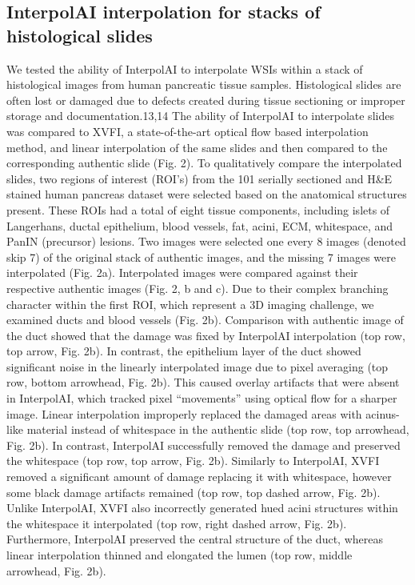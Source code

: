\begin{refsection}
    \section{InterpolAI interpolation for stacks of histological slides}
    We tested the ability of InterpolAI to interpolate WSIs within a stack of histological images from human pancreatic tissue samples. Histological slides are often lost or damaged due to defects created during tissue sectioning or improper storage and documentation\cite{}.13,14 The ability of InterpolAI to interpolate slides was compared to XVFI, a state-of-the-art optical flow based interpolation method, and linear interpolation of the same slides and then compared to the corresponding authentic slide (Fig. 2)\cite{leng2013a,upchurch2017a,liu2011a,blu2004a}. To qualitatively compare the interpolated slides, two regions of interest (ROI’s) from the 101 serially sectioned and H\&E stained human pancreas dataset were selected based on the anatomical structures present. These ROIs had a total of eight tissue components, including islets of Langerhans, ductal epithelium, blood vessels, fat, acini, ECM, whitespace, and PanIN (precursor) lesions. Two images were selected one every 8 images (denoted skip 7) of the original stack of authentic images, and the missing 7 images were interpolated (Fig. 2a). Interpolated images were compared against their respective authentic images (Fig. 2, b and c).
    Due to their complex branching character within the first ROI, which represent a 3D imaging challenge, we examined ducts and blood vessels (Fig. 2b). Comparison with authentic image of the duct showed that the damage was fixed by InterpolAI interpolation (top row, top arrow, Fig. 2b). In contrast, the epithelium layer of the duct showed significant noise in the linearly interpolated image due to pixel averaging (top row, bottom arrowhead, Fig. 2b). This caused overlay artifacts that were absent in InterpolAI, which tracked pixel “movements” using optical flow for a sharper image. Linear interpolation improperly replaced the damaged areas with acinus-like material instead of whitespace in the authentic slide (top row, top arrowhead, Fig. 2b). In contrast, InterpolAI successfully removed the damage and preserved the whitespace (top row, top arrow, Fig. 2b). Similarly to InterpolAI, XVFI removed a significant amount of damage replacing it with whitespace, however some black damage artifacts remained (top row, top dashed arrow, Fig. 2b). Unlike InterpolAI, XVFI also incorrectly generated hued acini structures within the whitespace it interpolated (top row, right dashed arrow, Fig. 2b). Furthermore, InterpolAI preserved the central structure of the duct, whereas linear interpolation thinned and elongated the lumen (top row, middle arrowhead, Fig. 2b). 

\end{refsection}
